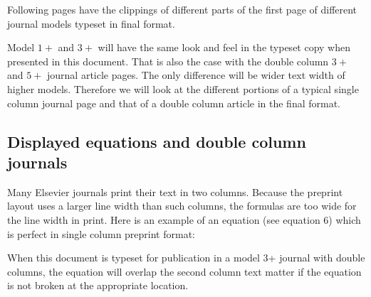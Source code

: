 \documentclass[a4paper,12pt]{article}
\begin{document}
Following pages have the clippings of different parts of
the first page of different journal models typeset in final
format.

\bigskip
\mywidth=14cm
\def\rulecolor{blue!70}
\def\rulecolor{orange}

\newpage
\vspace*{-18pt}
\def\rulecolor{blue!70}
\def\rulecolor{orange}

\medskip

\noindent
Model $1+$ and $3+$  will have the same look and
feel in the typeset copy when presented in this document. That is
also the case with the double column $3+$ and $5+$ journal article
pages. The only difference will be wider text width of
higher models.  Therefore we will look at the
different portions of a typical single column journal page and
that of a double column article in the final format.

\newpage
\vspace*{-18pt}
\def\rulecolor{blue!70}
\def\rulecolor{orange}

\newpage\vspace*{-18pt}
\def\rulecolor{blue!70}
\def\rulecolor{orange}

\subsection*{Displayed equations and double column journals}

Many Elsevier journals print their text in two columns. Because
the preprint layout uses a larger line width than such columns,
the formulas are too wide for the line width in print. Here is an
example of an equation  (see equation 6) which is perfect in
single column preprint format:

\bigskip
{}
\def\rulecolor{blue!70}
\def\rulecolor{orange}

\bigskip
\noindent When this document is typeset for publication in a
model 3+ journal with double columns, the equation will overlap
the second column text matter if the equation is not broken at
the appropriate location.
\end{document}
